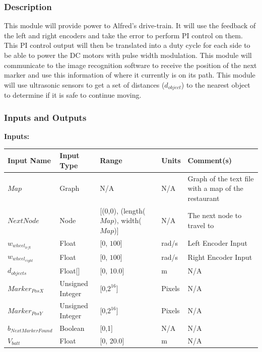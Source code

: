 \documentclass [10pt]{article}
\begin{document}
\subsubsection{Description}
This module will provide power to Alfred's drive-train. It will use the feedback of the left and right encoders and take the error to perform PI control on them. This PI control output will then be translated into a duty cycle for each side to be able to power the DC motors with pulse width modulation. This module will communicate to the image recognition software to receive the position of the next marker and use this information of where it currently is on its path. This module will use ultrasonic sensors to get a set of distances ($ d_{object} $) to the nearest object to determine if it is safe to continue moving.


\subsubsection{Inputs and Outputs}

\textbf{Inputs: } \\

\begin{longtable}{| p{} | p{} | p{} | p{} | p{} |}\hline 
	\rowcolor{tableCell}\textbf{Input Name} & \textbf{Input Type} & \textbf{Range} & \textbf{Units} & \textbf{Comment(s)} \\ \hline
	$ Map $ & Graph & N/A & N/A & Graph of the text file with a map of the restaurant \\ \hline
	\rowcolor{tableCell}$ NextNode $ & Node & [(0,0), (length($Map)$, width($Map$)] & N/A & The next node to travel to \\ \hline
	$ w_{wheel_{left}} $ & Float & [0, $ 100 $]& rad/s &  Left Encoder Input\\ \hline
	\rowcolor{tableCell}$ w_{wheel_{right}} $ & Float & [0, $ 100 $]& rad/s & Right Encoder Input \\ \hline
	$  d_{objects} $ & Float[] & [0, 10.0]& m &  N/A\\ \hline
	\rowcolor{tableCell}$ Marker_{PosX} $ & Unsigned Integer & [0,$2^{16}$] & Pixels &  N/A\\ \hline
	$ Marker_{PosY} $ & Unsigned Integer & [0,$2^{16}$] & Pixels & N/A\\ \hline
	\rowcolor{tableCell}$ b_{NextMarkerFound} $ & Boolean & [0,1] & N/A & N/A \\ \hline
	$  V_{batt} $ & Float & [0, 20.0]& m &  N/A\\ \hline
\end{longtable}
\end{document}
